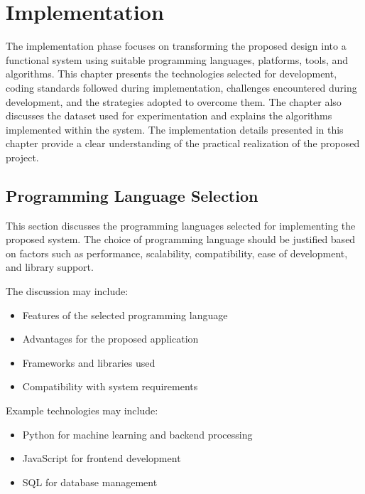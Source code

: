 \chapter{Implementation}

The implementation phase focuses on transforming the proposed design into a functional system using suitable programming languages, platforms, tools, and algorithms. This chapter presents the technologies selected for development, coding standards followed during implementation, challenges encountered during development, and the strategies adopted to overcome them. The chapter also discusses the dataset used for experimentation and explains the algorithms implemented within the system. The implementation details presented in this chapter provide a clear understanding of the practical realization of the proposed project.


\section{Programming Language Selection}

This section discusses the programming languages selected for implementing the proposed system. The choice of programming language should be justified based on factors such as performance, scalability, compatibility, ease of development, and library support.

The discussion may include:
\begin{itemize}
    \item Features of the selected programming language
    \item Advantages for the proposed application
    \item Frameworks and libraries used
    \item Compatibility with system requirements
\end{itemize}

Example technologies may include:
\begin{itemize}
    \item Python for machine learning and backend processing
    \item JavaScript for frontend development
    \item SQL for database management
\end{itemize}


